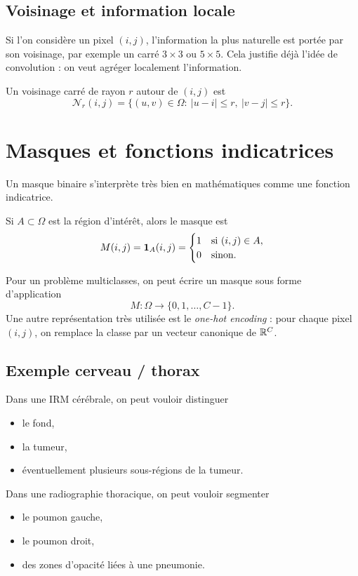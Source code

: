 \documentclass[11pt]{article}
\begin{document}
\subsection{Voisinage et information locale}
Si l'on considère un pixel $(i,j)$, l'information la plus naturelle est portée par son voisinage, par exemple un carré $3\times 3$ ou $5\times 5$. Cela justifie déjà l'idée de convolution : on veut agréger localement l'information.

\begin{mathBox}
Un voisinage carré de rayon $r$ autour de $(i,j)$ est
\[
\mathcal{N}_r(i,j)=\{(u,v)\in\Omega:\ |u-i|\le r,\ |v-j|\le r\}.
\]
\end{mathBox}

\section{Masques et fonctions indicatrices}
Un masque binaire s'interprète très bien en mathématiques comme une fonction indicatrice.

Si $A\subset \Omega$ est la région d'intérêt, alors le masque est
\[
M(i,j)=\mathbf{1}_A(i,j)=
\begin{cases}
1 & \text{si } (i,j)\in A,\\
0 & \text{sinon.}
\end{cases}
\]

Pour un problème multiclasses, on peut écrire un masque sous forme d'application
\[
M : \Omega \to \{0,1,\dots,C-1\}.
\]
Une autre représentation très utilisée est le \emph{one-hot encoding} : pour chaque pixel $(i,j)$, on remplace la classe par un vecteur canonique de $\mathbb{R}^C$.

\subsection{Exemple cerveau / thorax}
Dans une IRM cérébrale, on peut vouloir distinguer
\begin{itemize}
  \item le fond,
  \item la tumeur,
  \item éventuellement plusieurs sous-régions de la tumeur.
\end{itemize}
Dans une radiographie thoracique, on peut vouloir segmenter
\begin{itemize}
  \item le poumon gauche,
  \item le poumon droit,
  \item des zones d'opacité liées à une pneumonie.
\end{itemize}
\end{document}
